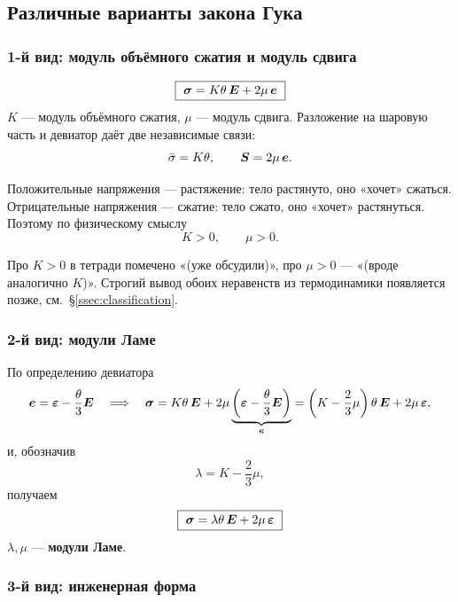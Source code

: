 \subsection{Различные варианты закона Гука}

\subsubsection*{1-й вид: модуль объёмного сжатия и модуль сдвига}

\[
  \boxed{\ \boldsymbol{\sigma} = K\theta\,\boldsymbol{E} + 2\mu\,\boldsymbol{e}\ }
\]
$K$ — модуль объёмного сжатия, $\mu$ — модуль сдвига. Разложение на шаровую
часть и девиатор даёт две независимые связи:
\[
  \bar\sigma = K\theta ,
  \qquad
  \boldsymbol{S} = 2\mu\,\boldsymbol{e} .
\]

Положительные напряжения — растяжение: тело растянуто, оно «хочет» сжаться.
Отрицательные напряжения — сжатие: тело сжато, оно «хочет» растянуться.
Поэтому по физическому смыслу
\[
  K > 0, \qquad \mu > 0 .
\]

\begin{warn}
Про $K>0$ в тетради помечено «(уже обсудили)», про $\mu>0$ — «(вроде аналогично
$K$)». Строгий вывод обоих неравенств из термодинамики появляется позже,
см.~\S\ref{ssec:classification}.
\end{warn}

\subsubsection*{2-й вид: модули Ламе}

По определению девиатора
\[
  \boldsymbol{e} = \boldsymbol{\varepsilon} - \frac{\theta}{3}\boldsymbol{E}
  \quad\Longrightarrow\quad
  \boldsymbol{\sigma} = K\theta\,\boldsymbol{E} + 2\mu\underbrace{\left(\boldsymbol{\varepsilon} - \frac{\theta}{3}\boldsymbol{E}\right)}_{\boldsymbol{e}}
  = \left(K - \frac{2}{3}\mu\right)\theta\,\boldsymbol{E} + 2\mu\,\boldsymbol{\varepsilon} ,
\]
и, обозначив
\[
  \lambda = K - \frac{2}{3}\mu ,
\]
получаем
\[
  \boxed{\ \boldsymbol{\sigma} = \lambda\theta\,\boldsymbol{E} + 2\mu\,\boldsymbol{\varepsilon}\ }
\]
$\lambda, \mu$ — \textbf{модули Ламе}.

\subsubsection*{3-й вид: инженерная форма}


